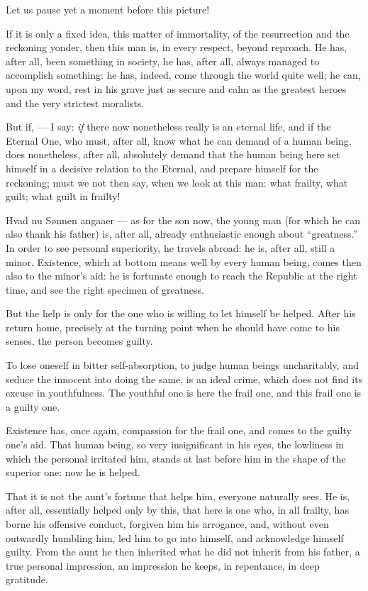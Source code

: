 \documentclass[12pt,a4paper]{book}
\begin{document}
Let us pause yet a moment before this picture!

If it is only a fixed idea, this matter of immortality, of the resurrection and the reckoning yonder, then this man is, in every respect, beyond reproach. He has, after all, been something in society, he has, after all, always managed to accomplish something: he has, indeed, come through the world quite well; he can, upon my word, rest in his grave just as secure and calm as the greatest heroes and the very strictest moralists.

But if, --- I say: \emph{if} there now nonetheless really is an eternal life, and if the Eternal One, who must, after all, know what he can demand of a human being, does nonetheless, after all, absolutely demand that the human being here set himself in a decisive relation to the Eternal, and prepare himself for the reckoning; must we not then say, when we look at this man: what frailty, what guilt; what guilt in frailty!

Hvad nu Sønnen angaaer --- as for the son now, the young man (for which he can also thank his father) is, after all, already enthusiastic enough about ``greatness.'' In order to see personal superiority, he travels abroad: he is, after all, still a minor. Existence, which at bottom means well by every human being, comes then also to the minor's aid: he is
fortunate enough to reach the Republic at the right time, and see the right specimen of greatness.

But the help is only for the one who is willing to let himself be helped. After his return home, precisely at the turning point when he should have come to his senses, the person becomes guilty.

To lose oneself in bitter self-absorption, to judge human beings uncharitably, and seduce the innocent into doing the same, is an ideal crime, which does not find its excuse in youthfulness. The youthful one is here the frail one, and this frail one is a guilty one.

Existence has, once again, compassion for the frail one, and comes to the guilty one's aid. That human being, so very insignificant in his eyes, the lowliness in which the personal irritated him, stands at last before him in the shape of the superior one: now he is helped.

That it is not the aunt's fortune that helps him, everyone naturally sees. He is, after all, essentially helped only by this, that here is one who, in all frailty, has borne his offensive conduct, forgiven him his arrogance, and, without even outwardly humbling him, led him to go into himself, and acknowledge himself guilty. From the aunt he then inherited what he did not inherit from his father, a true personal impression, an impression he keeps, in repentance, in deep gratitude.
\end{document}
